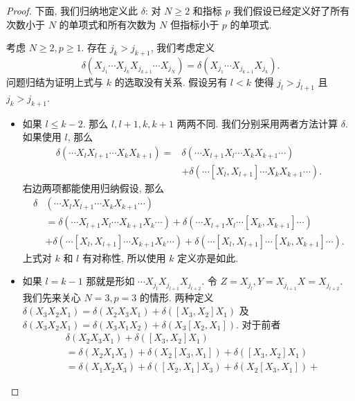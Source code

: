 \begin{proof}
  下面, 我们归纳地定义此 \( \delta \): 对 \( N \geq 2 \) 和指标 \( p \)
  我们假设已经定义好了所有次数小于 \( N \) 的单项式和所有次数为 \( N \)
  但指标小于 \( p \) 的单项式.

  考虑 \( N \geq 2, p \geq 1 \). 存在 \( j_k > j_{k + 1} \), 我们考虑定义
  \[
    \delta(X_{j_1} \cdots X_{j_k} X_{j_{k + 1}} \cdots X_{j_N}) = \delta(X_{j_1}
    \cdots X_{j_{k + 1}}X_{j_k}).
  \]
  问题归结为证明上式与 \( k \) 的选取没有关系. 假设另有 \( l < k \) 使得 \( j_l
  > j_{l + 1} \) 且 \( j_k > j_{k + 1} \).
  \begin{itemize}
    \item 如果 \( l \leq k - 2 \). 那么 \( l, l + 1, k, k + 1 \) 两两不同.
      我们分别采用两者方法计算 \( \delta \). 如果使用 \( l \), 那么
      \begin{align*}
        \delta(\cdots X_l X_{l + 1} \cdots X_k X_{k + 1}) =& \delta(\cdots X_{l
        + 1} X_l \cdots X_k X_{k + 1} \cdots)\\ &+ \delta(\cdots [X_l, X_{l + 1}]
        \cdots X_{k} X_{k + 1} \cdots).
      \end{align*}
      右边两项都能使用归纳假设, 那么
      \begin{align*}
        \delta &(\cdots X_l X_{l + 1}\cdots X_k X_{k + 1} \cdots)\\
               &=\delta(\cdots X_{l + 1} X_{l} \cdots X_{k + 1}X_k \cdots) +
               \delta(\cdots X_{l + 1}X_{l} \cdots [X_k, X_{k + 1}] \cdots)\\
               &+ \delta(\cdots [X_l, X_{l + 1}] \cdots X_{k + 1}X_k \cdots) +
               \delta(\cdots [X_l, X_{l + 1}]\cdots[X_k, X_{k + 1}]\cdots).
      \end{align*}
      上式对 \( k \) 和 \( l \) 有对称性, 所以使用 \( k \) 定义亦是如此.
    \item 如果 \( l  = k - 1 \) 那就是形如 \( \cdots X_{j_l}X_{j_{l + 1}}X_{j_{l
    + 2}} \).
      令 \( Z = X_{j_l}, Y = X_{j_{l + 1}} X = X_{j_{l + 2}} \). 我们先来关心 \(
      N = 3, p = 3 \) 的情形.
      两种定义 \( \delta(X_3 X_2 X_1) = \delta(X_2 X_3 X_1) + \delta([X_3,
      X_2]X_1) \) 及 \( \delta(X_3 X_2 X_1) = \delta(X_3X_1 X_2) +
      \delta(X_3[X_2, X_1]) \). 对于前者
      \begin{align*}
        &\delta(X_2 X_3X_1) + \delta([X_3, X_2] X_1)\\
        &= \delta(X_2 X_1 X_3) + \delta(X_2[X_3, X_1]) + \delta([X_3, X_2]X_1)\\
        & = \delta(X_1X_2X_3) + \delta([X_2, X_1]X_3) + \delta(X_2[X_3, X_1]) +

\end{align*}
\end{itemize}
\end{proof}
